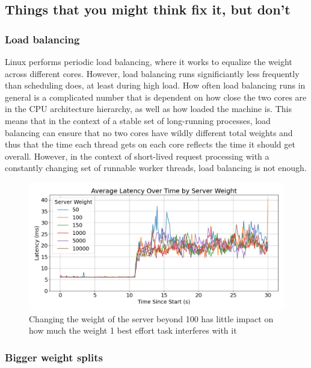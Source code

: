 
\subsection{Things that you might think fix it, but don't}

\subsubsection{Load balancing}

Linux performs periodic load balancing, where it works to equalize the weight
across different cores. However, load balancing runs significiantly less
frequently than scheduling does, at least during high load. How often load
balancing runs in general is a complicated number that is dependent on how close
the two cores are in the CPU architecture hierarchy, as well as how loaded the
machine is. This means that in the context of a stable set of long-running
processes, load balancing can ensure that no two cores have wildly different
total weights and thus that the time each thread gets on each core reflects the
time it should get overall. However, in the context of short-lived request
processing with a constantly changing set of runnable worker threads, load
balancing is not enough.

\begin{figure}[t]
    \centering
    \includegraphics[width=\columnwidth]{graphs/srv-bg-weight-cmp-low.png}
    \caption{Changing the weight of the server beyond 100 has little impact on
    how much the weight 1 best effort task interferes with
    it}\label{fig:srv-bg-weight-cmp}
\end{figure}

\subsubsection{Bigger weight splits}

